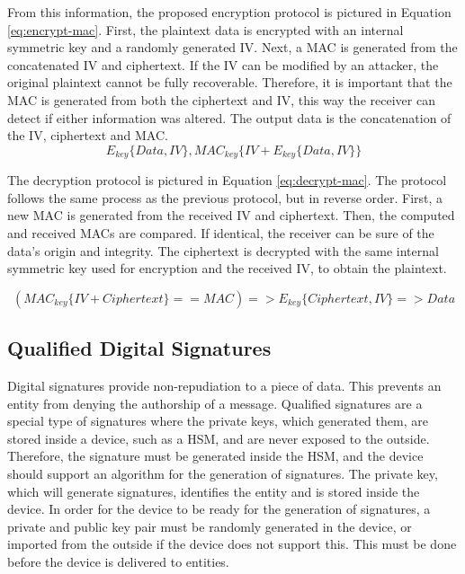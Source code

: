 From this information, the proposed encryption protocol is pictured in Equation \ref{eq:encrypt-mac}. First, the plaintext data is encrypted with an internal symmetric key and a randomly generated IV. Next, a MAC is generated from the concatenated IV and ciphertext.
If the IV can be modified by an attacker, the original plaintext cannot be fully recoverable. Therefore, it is important that the MAC is generated from both the ciphertext and IV, this way the receiver can detect if either information was altered.
The output data is the concatenation of the IV, ciphertext and MAC.
\begin{equation}
	\label{eq:encrypt-mac}
	E_{key}\{Data, IV\}, MAC_{key}\{IV+E_{key}\{Data, IV\}\}
\end{equation}

The decryption protocol is pictured in Equation \ref{eq:decrypt-mac}. The protocol follows the same process as the previous protocol, but in reverse order. First, a new MAC is generated from the received IV and ciphertext. Then, the computed and received MACs are compared. If identical, the receiver can be sure of the data's origin and integrity. The ciphertext is decrypted with the same internal symmetric key used for encryption and the received IV, to obtain the plaintext.

\begin{equation}
	\label{eq:decrypt-mac}
	(MAC_{key}\{IV+Ciphertext\} == MAC) => E_{key}\{Ciphertext, IV\} => Data
\end{equation}

\subsection{Qualified Digital Signatures}\label{chap:arch:services:signatures}

Digital signatures provide non-repudiation to a piece of data. This prevents an entity from denying the authorship of a message. Qualified signatures are a special type of signatures where the private keys, which generated them, are stored inside a device, such as a HSM, and are never exposed to the outside.
Therefore, the signature must be generated inside the HSM, and the device should support an algorithm for the generation of signatures.
The private key, which will generate signatures, identifies the entity and is stored inside the device. In order for the device to be ready for the generation of signatures, a private and public key pair must be randomly generated in the device, or imported from the outside if the device does not support this. This must be done before the device is delivered to entities.

